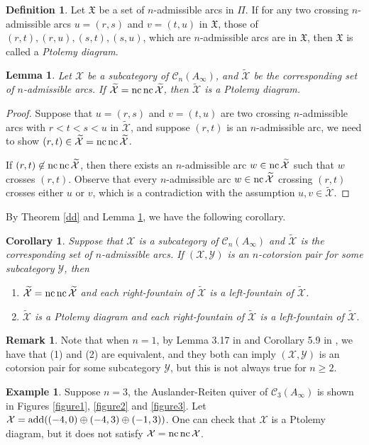 \documentclass[a4paper,reqno,11pt]{amsart}
\newtheorem{lemma}[theorem]{Lemma}
\newtheorem{corollary}[theorem]{Corollary}
\theoremstyle{definition}
\newtheorem{definition}[theorem]{Definition}
\newtheorem{remark}[theorem]{Remark}
\newtheorem{example}[theorem]{Example}
\def\C{\mathcal{C}}
\def\X{\mathcal{X}}
\def\Y{\mathcal{Y}}
\providecommand{\add}{\mathop{\rm add}\nolimits}%
\providecommand{\nc}{\mathop{\rm nc}\nolimits}%
\def\XX{\widetilde{\X}}
\begin{document}
\begin{definition}
Let $\mathfrak{X}$ be a set of $n$-admissible arcs in $\Pi$.  If for any two crossing $n$-admissible arcs $u=(r,s)$ and $v=(t,u)$ in $\mathfrak{X}$, those of $(r,t),(r,u),(s,t),(s,u)$, which are $n$-admissible arcs are in $\mathfrak{X}$, then $\mathfrak{X}$ is called a \emph{Ptolemy diagram}.
\end{definition}
\begin{lemma}\label{j}
Let $\X$ be a subcategory of $\C_n(A_{\infty})$, and $\XX$ be the corresponding set of $n$-admissible arcs. If $\XX=\nc\nc\XX$, then $\XX$ is a Ptolemy diagram.
\end{lemma}
\begin{proof}

Suppose that $u=(r,s)$ and $v=(t,u)$ are two crossing $n$-admissible arcs with $r<t<s<u$ in $\XX$, and suppose $(r,t)$ is an $n$-admissible arc, we need to show $(r,t)\in\XX=\nc\nc\XX$.

If $(r,t)\not\in\nc\nc\XX$, then there exists an $n$-admissible arc $w\in\nc\XX$ such that $w$ crosses $(r,t)$. Observe that every $n$-admissible arc $w\in\nc\XX$ crossing $(r,t)$ crosses either $u$ or $v$,  which is a contradiction with the assumption $u,v\in\XX$.
\end{proof}
By Theorem \ref{dd} and Lemma \ref{j}, we have the following corollary.
\begin{corollary}
Suppose that $\X$ is a subcategory of $\C_n(A_{\infty})$ and $\XX$ is the corresponding set of $n$-admissible arcs. If  $(\X,\Y)$ is an $n$-cotorsion pair for some subcategory $\Y$, then
\begin{enumerate}

  \item[\rm (1)] $\XX=\nc\nc\XX$ and each right-fountain of $\XX$ is a left-fountain of $\XX$.

\smallskip

  \item[\rm (2)]  $\XX$ is a Ptolemy diagram and each right-fountain of $\XX$ is a left-fountain of $\XX$.
\end{enumerate}
\end{corollary}
\begin{remark}
Note that when $n=1$, by Lemma 3.17 in \cite{Ng} and Corollary 5.9 in \cite{CZZ1}, we have that (1) and (2) are equivalent, and they both can imply $(\X,\Y)$ is an cotorsion pair for some subcategory $\Y$, but this is not always true for  $n\geq 2$.
\end{remark}
\begin{example}
Suppose $n=3$, the Auslander-Reiten quiver  of $\C_3(A_{\infty})$ is shown in Figures \ref{figure1}, \ref{figure2} and \ref{figure3}. Let $\X=\add((-4,0)\oplus(-4,3)\oplus(-1,3))$. One can check that $\X$ is a Ptolemy diagram, but it does not satisfy $\X=\nc\nc\X$.
\end{example}
\end{document}
